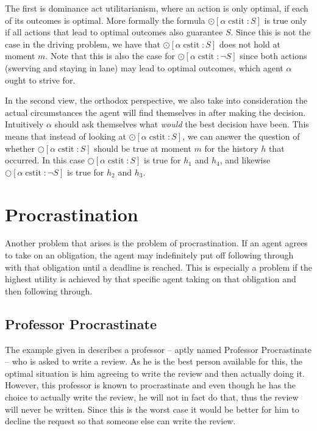 \documentclass{article}
\newcommand{\cstit}{\operatorname{cstit}}
\begin{document}
The first is dominance act utilitarianism, where an action is only optimal, if each of its outcomes is optimal. More formally the formula $\odot [\alpha \cstit \colon S]$ is true only if all actions that lead to optimal outcomes also guarantee $S$. Since this is not the case in the driving problem, we have that $\odot [\alpha \cstit \colon S]$ does not hold at moment $m$. Note that this is also the case for $\odot [\alpha \cstit \colon \lnot S]$ since both actions (swerving and staying in lane) may lead to optimal outcomes, which agent $\alpha$ ought to strive for.

In the second view, the orthodox perspective, we also take into consideration the actual circumstances the agent will find themselves in after making the decision. Intuitively $\alpha$ should ask themselves what \emph{would} the best decision have been. This means that instead of looking at $\odot [\alpha \cstit \colon S]$, we can answer the question of whether $\bigcirc [\alpha \cstit \colon S]$ should be true at moment $m$ for the history $h$ that occurred. In this case $\bigcirc [\alpha \cstit \colon S]$ is true for $h_1$ and $h_4$, and likewise $\bigcirc [\alpha \cstit \colon \lnot S]$ is true for $h_2$ and $h_3$.

\section{Procrastination}
Another problem that arises is the problem of procrastination. If an agent agrees to take on an obligation, the agent may indefinitely put off following through with that obligation until a deadline is reached. This is especially a problem if the highest utility is achieved by that specific agent taking on that obligation and then following through.

\subsection{Professor Procrastinate}
The example given in \cite{mdl} describes a professor -- aptly named Professor Procrastinate -- who is asked to write a review. As he is the best person available for this, the optimal situation is him agreeing to write the review and then actually doing it. However, this professor is known to procrastinate and even though he has the choice to actually write the review, he will not in fact do that, thus the review will never be written. Since this is the worst case it would be better for him to decline the request so that someone else can write the review.
\end{document}
